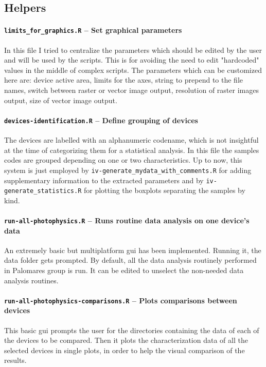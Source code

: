 	\subsection{Helpers}
		\paragraph{\texttt{limits\_for\_graphics.R} -- Set graphical parameters}
		In this file I tried to centralize the parameters which should be edited by the user and will be used by the scripts.
		This is for avoiding the need to edit "hardcoded" values in the middle of complex scripts.
		The parameters which can be customized here are: device active area, limits for the axes, string to prepend to the file names, switch between raster or vector image output, resolution of raster images output, size of vector image output.

		\paragraph{\texttt{devices-identification.R} -- Define grouping of devices}
		The devices are labelled with an alphanumeric codename, which is not insightful at the time of categorizing them for a statistical analysis.
		In this file the samples codes are grouped depending on one or two characteristics.
		Up to now, this system is just employed by \texttt{iv-generate\_mydata\_with\_comments.R} for adding supplementary information to the extracted parameters and by \texttt{iv-generate\_statistics.R} for plotting the boxplots separating the samples by kind.

		\paragraph{\texttt{run-all-photophysics.R} -- Runs routine data analysis on one device's data}
		An extremely basic but multiplatform \gls{gui} has been implemented.
		Running it, the data folder gets prompted.
		By default, all the data analysis routinely performed in Palomares group is run.
		It can be edited to unselect the non-needed data analysis routines.
		
		\paragraph{\texttt{run-all-photophysics-comparisons.R} -- Plots comparisons between devices}
		This basic \gls{gui} prompts the user for the directories containing the data of each of the devices to be compared.
		Then it plots the characterization data of all the selected devices in single plots, in order to help the visual comparison of the results.
		
